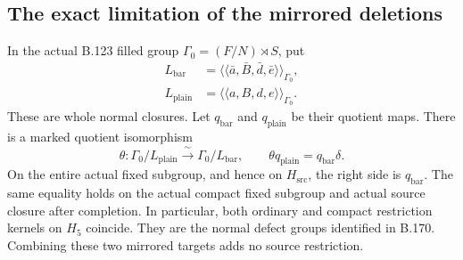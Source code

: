 \subsection*{The exact limitation of the mirrored deletions}
\label{stmt:B171}
In the actual B.123 filled group \(\Gamma_0=(F/N)\rtimes S\), put
\[
 \begin{aligned}
 L_{\mathrm{bar}}
   &=\langle\!\langle\bar a,\bar B,\bar d,\bar e
                    \rangle\!\rangle_{\Gamma_0},\\
 L_{\mathrm{plain}}
   &=\langle\!\langle a,B,d,e\rangle\!\rangle_{\Gamma_0}.
 \end{aligned}
\]
These are whole normal closures. Let
\(q_{\mathrm{bar}}\) and \(q_{\mathrm{plain}}\) be their quotient maps.
There is a marked quotient isomorphism
\begin{equation}\label{eq:B171-mirror-isomorphism}
 \theta:\Gamma_0/L_{\mathrm{plain}}
       \xrightarrow{\;\sim\;}\Gamma_0/L_{\mathrm{bar}},
 \qquad
 \theta q_{\mathrm{plain}}=q_{\mathrm{bar}}\delta.
\end{equation}
On the entire actual fixed subgroup, and hence on \(H_{\mathrm{src}}\),
the right side is \(q_{\mathrm{bar}}\). The same equality holds on the
actual compact fixed subgroup and actual source closure after completion.
In particular, both ordinary and compact restriction kernels on \(H_5\)
coincide. They are the normal defect groups identified in B.170.
Combining these two mirrored targets adds no source restriction.

